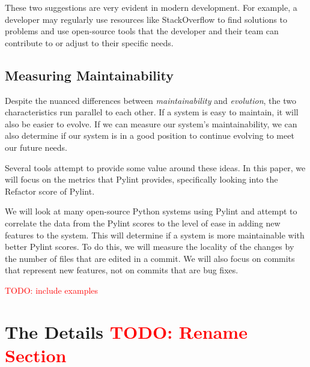 \documentclass[12pt,conference]{IEEEtran}
\newcommand\todo[1]{\textcolor{red}{#1}}
\begin{document}
These two suggestions are very evident in modern development. For example, a developer may regularly use resources like StackOverflow to find solutions to problems and use open-source tools that the developer and their team can contribute to or adjust to their specific needs.

\subsection{Measuring Maintainability}

Despite the nuanced differences between \textit{maintainability} and \textit{evolution}, the two characteristics run parallel to each other. If a system is easy to maintain, it will also be easier to evolve. If we can measure our system's maintainability, we can also determine if our system is in a good position to continue evolving to meet our future needs.

Several tools attempt to provide some value around these ideas. In this paper, we will focus on the metrics that Pylint provides, specifically looking into the Refactor score of Pylint.

We will look at many open-source Python systems using Pylint and attempt to correlate the data from the Pylint scores to the level of ease in adding new features to the system. This will determine if a system is more maintainable with better Pylint scores. To do this, we will measure the locality of the changes by the number of files that are edited in a commit. We will also focus on commits that represent new features, not on commits that are bug fixes.

\todo{TODO: include examples}


\vspace{0.5cm}
\section{The Details \todo{TODO: Rename Section}}
\vspace{0.25cm}

\end{document}
